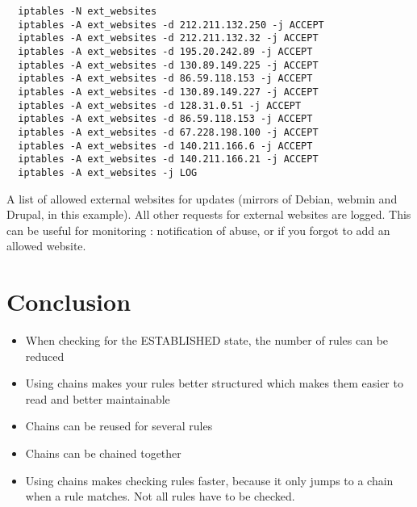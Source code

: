 \documentclass[a4paper,12pt]{article}
\begin{document}
\begin{verbatim}
  iptables -N ext_websites
  iptables -A ext_websites -d 212.211.132.250 -j ACCEPT
  iptables -A ext_websites -d 212.211.132.32 -j ACCEPT
  iptables -A ext_websites -d 195.20.242.89 -j ACCEPT
  iptables -A ext_websites -d 130.89.149.225 -j ACCEPT
  iptables -A ext_websites -d 86.59.118.153 -j ACCEPT
  iptables -A ext_websites -d 130.89.149.227 -j ACCEPT
  iptables -A ext_websites -d 128.31.0.51 -j ACCEPT
  iptables -A ext_websites -d 86.59.118.153 -j ACCEPT
  iptables -A ext_websites -d 67.228.198.100 -j ACCEPT
  iptables -A ext_websites -d 140.211.166.6 -j ACCEPT
  iptables -A ext_websites -d 140.211.166.21 -j ACCEPT
  iptables -A ext_websites -j LOG
\end{verbatim}

A list of allowed external websites for updates (mirrors of Debian, webmin and Drupal, in this example).
All other requests for external websites are logged. This can be useful for monitoring : notification of abuse, or if you forgot to add an allowed website.

\section{Conclusion}
\begin{itemize}
  \item When checking for the ESTABLISHED state, the number of rules can be reduced
  \item Using chains makes your rules better structured which makes them easier to read and better maintainable
  \item Chains can be reused for several rules
  \item Chains can be chained together
  \item Using chains makes checking rules faster, because it only jumps to a chain when a rule matches. Not all rules have to be checked.
\end{itemize}
\end{document}
